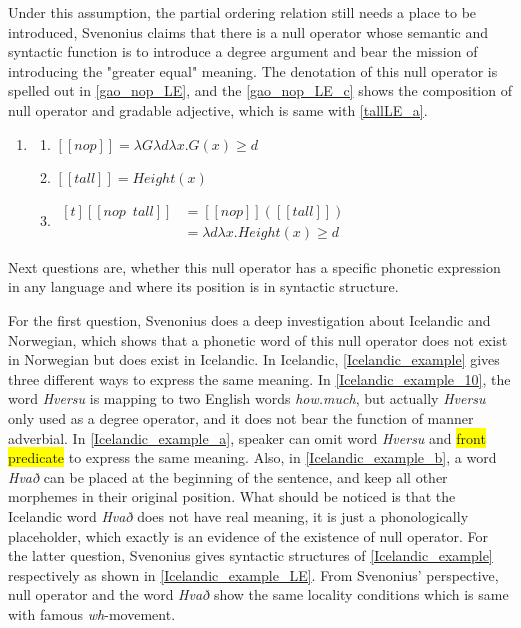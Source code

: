 \documentclass{ctexart}
\let \cite \parencite
\begin{document}
Under this assumption, the partial ordering relation still needs a place to be introduced, Svenonius\cite{svenonius2006} claims that there is a null operator whose semantic and syntactic function is to introduce a degree argument and bear the mission of introducing the "greater equal" meaning. The denotation of this null operator is spelled out in \ref{gao_nop_LE}, and the \ref{gao_nop_LE_c} shows the composition of null operator and gradable adjective, which is same with \ref{tallLE_a}.

\begin{enumerate}[resume]
    \item \label{gao_nop_LE}

    \begin{enumerate}[ref=(\arabic{enumi}\alph*)]
        \item \label{gao_nop_LE_a} 
        $[\![nop]\!]=\lambda G\lambda d \lambda x.G(x) \geq d$

        \item \label{gao_nop_LE_b} 
        $[\![tall]\!]=Height(x)$

        \item \label{gao_nop_LE_c} 
        $\begin{aligned}[t]
            [\![nop \enspace tall]\!] &= [\![nop]\!]([\![tall]\!]) \\
            &= \lambda d \lambda x.Height(x) \geq d
        \end{aligned}$

    \end{enumerate}
\end{enumerate}

Next questions are, whether this null operator has a specific phonetic expression in any language and where its position is in syntactic structure. 

For the first question, Svenonius does a deep investigation about Icelandic and Norwegian, which shows that a phonetic word of this null operator does not exist in Norwegian but does exist in Icelandic. In Icelandic, \ref{Icelandic_example} gives three different ways to express the same meaning. In \ref{Icelandic_example_10}, the word \textit{Hversu} is mapping to two English words \textit{how.much}, but actually \textit{Hversu} only used as a degree operator, and it does not bear the function of manner adverbial. In \ref{Icelandic_example_a}, speaker can omit word \textit{Hversu} and \colorbox{yellow}{front predicate} to express the same meaning. Also, in \ref{Icelandic_example_b}, a word \textit{Hvað} can be placed at the beginning of the sentence, and keep all other morphemes in their original position. What should be noticed is that the Icelandic word \textit{Hvað} does not have real meaning, it is just a phonologically placeholder, which exactly is an evidence of the existence of null operator. For the latter question, Svenonius gives syntactic structures of \ref{Icelandic_example} respectively as shown in \ref{Icelandic_example_LE}. From Svenonius' perspective, null operator and the word \textit{Hvað} show the same locality conditions which is same with famous \textit{wh}-movement. 
\end{document}
